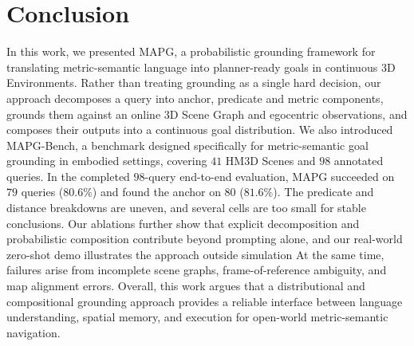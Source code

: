 \section{Conclusion}
In this work, we presented MAPG, a probabilistic grounding framework for translating metric-semantic language into planner-ready goals in continuous $3$D Environments. Rather than treating grounding as a single hard decision, our approach decomposes a query into anchor, predicate and metric components, grounds them against an online $3$D Scene Graph and egocentric observations, and composes their outputs into a continuous goal distribution. We also introduced MAPG-Bench, a benchmark designed specifically for metric-semantic goal grounding in embodied settings, covering $41$ HM$3$D Scenes and $98$ annotated queries. In the completed $98$-query end-to-end evaluation, MAPG succeeded on $79$ queries ($80.6\%$) and found the anchor on $80$ ($81.6\%$). The predicate and distance breakdowns are uneven, and several cells are too small for stable conclusions. Our ablations further show that explicit decomposition and probabilistic composition contribute beyond prompting alone, and our real-world zero-shot demo illustrates the approach outside simulation 
At the same time, failures arise from incomplete scene graphs, frame-of-reference ambiguity, and map alignment errors. 
Overall, this work argues that a distributional and compositional grounding approach provides a reliable interface between language understanding, spatial memory, and execution for open-world metric-semantic navigation.
